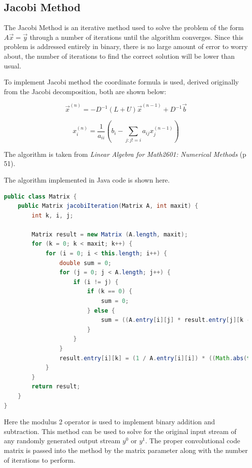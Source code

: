 \documentclass[letterpaper,12pt]{article}
\begin{document}
\subsection{Jacobi Method}

The Jacobi Method is an iterative method used to solve the problem of the form
$A\vec{x} = \vec{y}$ through a number of iterations until the algorithm converges.
Since this problem is addressed entirely in binary, there is no large amount of
error to worry about, the number of iterations to find the correct solution will
be lower than usual.

To implement Jacobi method the coordinate formula is used, derived originally
from the Jacobi decomposition, both are shown below:

\[\vec{x}^{(n)} = -D^{-1}(L + U)\vec{x}^{(n-1)} + D^{-1}\vec{b}\]

\[x_i^{(n)} = \frac{1}{a_{ii}} ( b_i - \sum_{j:j != i} a_{ij}x_{j}^{(n-1)}) \]

The algorithm is taken from \textit{Linear Algebra for Math2601: Numerical Methods} (p 51).

The algorithm implemented in Java code is shown here.

\lstset{caption=Jacobi Implementation}
\begin{lstlisting}[language=java]
public class Matrix {
    public Matrix jacobiIteration(Matrix A, int maxit) {
        int k, i, j;
        
        Matrix result = new Matrix (A.length, maxit);
        for (k = 0; k < maxit; k++) {
            for (i = 0; i < this.length; i++) {
                double sum = 0;
                for (j = 0; j < A.length; j++) {
                    if (i != j) {
                        if (k == 0) {
                            sum = 0;
                        } else {
                            sum = ((A.entry[i][j] * result.entry[j][k - 1]) + sum) % 2;
                        }
                    }
                }
                result.entry[i][k] = (1 / A.entry[i][i]) * ((Math.abs(this.entry[i][0] - sum))) % 2;
            }
        } 
        return result;
    }
}
\end{lstlisting}

Here the modulus 2 operator is used to implement binary addition and subtraction.
This method can be used to solve for the original input stream of any randomly
generated output stream $y^0$ or $y^1$.
The proper convolutional code matrix is passed into the method by the matrix
parameter along with the number of iterations to perform.
\end{document}
